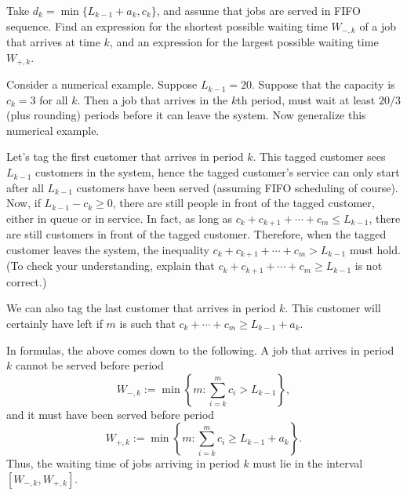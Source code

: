 \begin{exercise}  
Take $d_k = \min\{L_{k-1}+a_k, c_k\}$, and assume that jobs are served in FIFO sequence.
 Find an expression for the shortest possible waiting time $W_{-,k}$ of a job that arrives at time $k$, and an expression for the largest possible waiting time $W_{+,k}$.
\begin{hint}
 Consider a numerical example.
 Suppose $L_{k-1}=20$.
 Suppose that the capacity is $c_k=3$ for all $k$.
 Then a job that arrives in the $k$th period, must wait at least $20/3$ (plus rounding) periods before it can leave the system.
 Now generalize this numerical example.
\end{hint}
\begin{solution}
 Let's tag the first customer that arrives in period $k$.
 This tagged customer sees $L_{k-1}$ customers in the system, hence the tagged customer's service can only start after all $L_{k-1}$ customers have been served (assuming FIFO scheduling of course).
 Now, if $L_{k-1}-c_k \geq 0$, there are still people in front of the tagged customer, either in queue or in service.
 In fact, as long as $c_k+c_{k+1}+\cdots +c_m \leq L_{k-1}$, there are still customers in front of the tagged customer.
 Therefore, when the tagged customer leaves the system, the inequality $c_k+c_{k+1}+\cdots +c_m > L_{k-1}$ must hold.
 (To check your understanding, explain that $c_k+c_{k+1}+\cdots +c_m \geq L_{k-1}$ is not correct.)

 We can also tag the last customer that arrives in period $k$.
 This customer will certainly have left if $m$ is such that $c_k+\cdots+c_m \geq L_{k-1}+a_k$.

 In formulas, the above comes down to the following.
 A job that arrives in period $k$ cannot be served before period
 \begin{equation*}
 W_{-,k}:= \min\left\{m: \sum_{i=k}^{m} c_i > L_{k-1}\right\},
 \end{equation*}
 and it must have been served before period
 \begin{equation*}
 W_{+,k}:= \min\left\{m: \sum_{i=k}^{m} c_i \geq
 L_{k-1}+a_k\right\}.
 \end{equation*}
 Thus, the waiting time of jobs arriving in period $k$ must lie in
 the interval $[W_{-,k}, W_{+,k}]$.
\end{solution}
\end{exercise}

